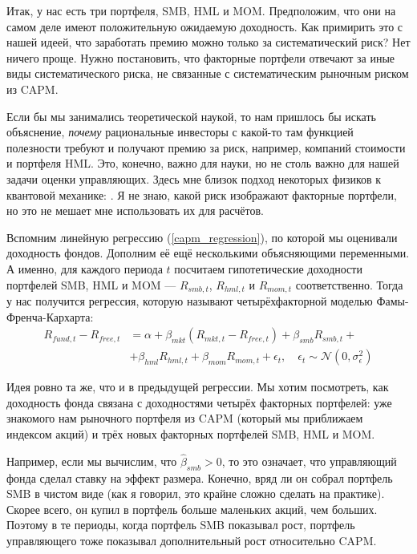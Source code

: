 Итак, у нас есть три портфеля, SMB, HML и MOM. Предположим, что они на самом 
деле имеют положительную ожидаемую доходность. Как примирить это с нашей идеей, 
что заработать премию можно только за систематический риск? Нет ничего проще. 
Нужно постановить, что факторные портфели отвечают за иные виды систематического 
риска, не связанные с систематическим рыночным риском из CAPM.

Если бы мы занимались теоретической наукой, то нам пришлось бы искать 
объяснение, \emph{почему} рациональные инвесторы с какой-то там функцией 
полезности требуют и получают премию за риск, например, компаний стоимости и 
портфеля HML. Это, конечно, важно для науки, но не столь важно для нашей задачи 
оценки управляющих. Здесь мне близок подход некоторых физиков к квантовой 
механике: . Я не знаю, 
какой риск изображают факторные портфели, но это не мешает мне использовать их 
для расчётов.

Вспомним линейную регрессию (\ref{capm_regression}), по которой мы оценивали 
доходность фондов. Дополним её ещё несколькими объясняющими переменными. А 
именно, для каждого периода $t$ посчитаем гипотетические доходности портфелей 
SMB, HML и MOM --- $R_{smb,t}$, $R_{hml,t}$ и $R_{mom,t}$ соответственно. Тогда 
у нас получится регрессия, которую называют четырёхфакторной моделью Фамы-
Френча-Кархарта:
\begin{align}
\nonumber
R_{fund,t} - R_{free,t} &= \alpha
+ \beta_{mkt}\left(R_{mkt,t} - R_{free,t}\right) 
+ \beta_{smb}R_{smb,t} + \\
&+ \beta_{hml}R_{hml,t}
+ \beta_{mom}R_{mom,t}
+ \epsilon_t,
\quad
\epsilon_t \sim \mathcal{N}(0, \sigma_{\epsilon}^2)
\label{four_factor_regression}
\end{align}

Идея ровно та же, что и в предыдущей регрессии. Мы хотим посмотреть, как 
доходность фонда связана с доходностями четырёх факторных портфелей: уже 
знакомого нам рыночного портфеля из CAPM (который мы приближаем индексом акций) 
и трёх новых факторных портфелей SMB, HML и MOM.

Например, если мы вычислим, что $\hat{\beta}_{smb} > 0$, то это означает, что 
управляющий фонда сделал ставку на эффект размера. Конечно, вряд ли он собрал 
портфель SMB в чистом виде (как я говорил, это крайне сложно сделать на 
практике). Скорее всего, он купил в портфель больше маленьких акций, чем 
больших. Поэтому в те периоды, когда портфель SMB показывал рост, портфель 
управляющего тоже показывал дополнительный рост относительно CAPM.

